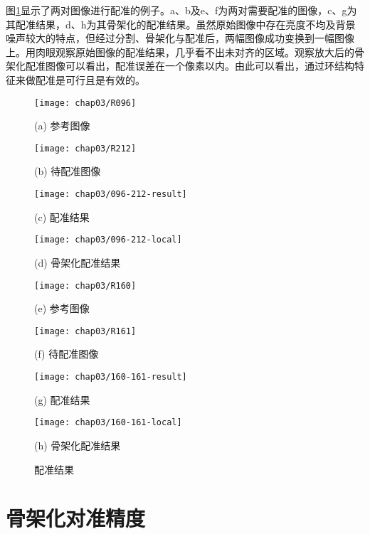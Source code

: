 图\ref{fig:result}显示了两对图像进行配准的例子。a、b及e、f为两对需要配准的图像，c、g为其配准结果，d、h为其骨架化的配准结果。虽然原始图像中存在亮度不均及背景噪声较大的特点，但经过分割、骨架化与配准后，两幅图像成功变换到一幅图像上。用肉眼观察原始图像的配准结果，几乎看不出未对齐的区域。观察放大后的骨架化配准图像可以看出，配准误差在一个像素以内。由此可以看出，通过环结构特征来做配准是可行且是有效的。
\begin{figure}
\centering
\begin{minipage}[b]{0.48\textwidth} 
      \centering 
      \texttt{[image: chap03/R096]}
        \centerline{(a) 参考图像}\medskip
\end{minipage}
  \begin{minipage}[b]{0.48\textwidth}
    \centering
    \texttt{[image: chap03/R212]}
      \centerline{(b) 待配准图像}\medskip
  \end{minipage}
  \begin{minipage}[b]{0.48\textwidth}
    \centering
    \texttt{[image: chap03/096-212-result]}
      \centerline{(c) 配准结果}\medskip
  \end{minipage}
  \begin{minipage}[b]{0.48\textwidth}
    \centering
    \texttt{[image: chap03/096-212-local]}
      \centerline{(d) 骨架化配准结果}\medskip
  \end{minipage}
 \begin{minipage}[b]{0.48\textwidth}
    \centering
      \texttt{[image: chap03/R160]}
        \centerline{(e) 参考图像}\medskip
    \end{minipage}
\begin{minipage}[b]{0.48\textwidth}
	\centering
      \texttt{[image: chap03/R161]}
        \centerline{(f) 待配准图像}\medskip
    \end{minipage}
  \begin{minipage}[b]{0.48\textwidth}
    \centering
    \texttt{[image: chap03/160-161-result]}
      \centerline{(g) 配准结果}\medskip
  \end{minipage}
  \begin{minipage}[b]{0.48\textwidth}
    \centering
    \texttt{[image: chap03/160-161-local]}
      \centerline{(h) 骨架化配准结果}\medskip
  \end{minipage}
\caption{配准结果}
\label{fig:result}
\end{figure}



\section{骨架化对准精度}

